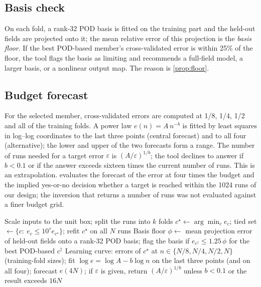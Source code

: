 \subsection{Basis check}
On each fold, a rank-32 POD basis is fitted on the training part and the held-out fields are projected onto it; the mean relative error of this projection is the \emph{basis floor}. If the best POD-based member's cross-validated error is within 25\% of the floor, the tool flags the basis as limiting and recommends a full-field model, a larger basis, or a nonlinear output map. The reason is \cref{prop:floor}.

\subsection{Budget forecast}
For the selected member, cross-validated errors are computed at 1/8, 1/4, 1/2 and all of the training folds. A power law $e(n)=A\,n^{-b}$ is fitted by least squares in log--log coordinates to the last three points (central forecast) and to all four (alternative); the lower and upper of the two forecasts form a range. The number of runs needed for a target error $\varepsilon$ is $(A/\varepsilon)^{1/b}$; the tool declines to answer if $b<0.1$ or if the answer exceeds sixteen times the current number of runs. This is an extrapolation.  evaluates the forecast of the error at four times the budget and the implied yes-or-no decision whether a target is reached within the 1024 runs of our design; the inversion that returns a number of runs was not evaluated against a finer budget grid.

\begin{algorithm}[t]\caption{SurroSelect (default settings)}\label{alg:surroselect}
Scale inputs to the unit box; split the runs into $k$ folds\;
$c^\star\leftarrow\arg\min_c e_c$; tied set $\leftarrow\{c:\ e_c\le 10^{\tau}e_{c^\star}\}$; refit $c^\star$ on all $N$ runs\;
Basis floor $\phi\leftarrow$ mean projection error of held-out fields onto a rank-32 POD basis; flag the basis if $e_{c^\dagger}\le1.25\,\phi$ for the best POD-based $c^\dagger$\;
Learning curve: errors of $c^\star$ at $n\in\{N/8,N/4,N/2,N\}$ (training-fold sizes); fit $\log e=\log A-b\log n$ on the last three points (and on all four); forecast $e(4N)$; if $\varepsilon$ is given, return $(A/\varepsilon)^{1/b}$ unless $b<0.1$ or the result exceeds $16N$\;
\end{algorithm}


